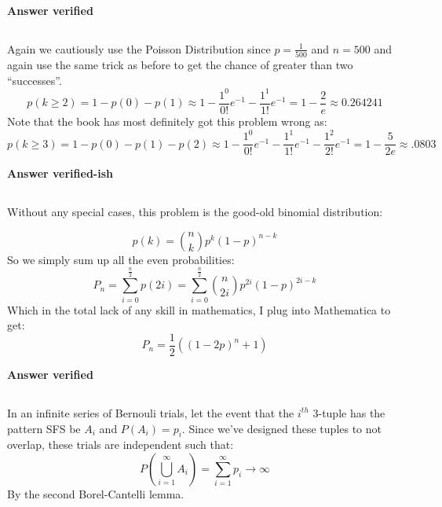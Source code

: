 \textbf{Answer verified}

\subsection{}

Again we cautiously use the Poisson Distribution since $p=\frac{1}{500}$ and $n=500$ and again use the same trick as before to get the chance of greater than two ``successes''.
\begin{equation}
	p(k \geq 2) = 1 - p(0) - p(1) \approx 1 - \frac{1^0}{0!}e^{-1} - \frac{1^1}{1!}e^{-1} = 1 - \frac{2}{e} \approx 0.264241
\end{equation}
Note that the book has most definitely got this problem wrong as:
\begin{equation}
	p(k \geq 3) = 1 - p(0) - p(1) - p(2) \approx 1 - \frac{1^0}{0!}e^{-1} - \frac{1^1}{1!}e^{-1}- \frac{1^2}{2!}e^{-1} = 1 - \frac{5}{2e} \approx .0803
\end{equation}

\textbf{Answer verified-ish}


\subsection{}

Without any special cases, this problem is the good-old binomial distribution:

\begin{equation}
	p(k) = \binom{n}{k} p^k(1-p)^{n-k}
\end{equation}
So we simply sum up all the even probabilities:
\begin{equation}
	P_n = \sum_{i=0}^{\frac{n}{2}} p(2i) = \sum_{i=0}^{\frac{n}{2}} \binom{n}{2i} p^{2i}(1-p)^{2i-k}
\end{equation}
Which in the total lack of any skill in mathematics, I plug into Mathematica to get:
\begin{equation}
	P_n = \frac{1}{2} \left((1-2 p)^n+1\right)
\end{equation}

\textbf{Answer verified}

\subsection{}
In an infinite series of Bernouli trials, let the event that the $i^{th}$ 3-tuple has the pattern SFS be $A_i$ and $P(A_i)=p_i$.  Since we've designed these tuples to not overlap, these trials are independent such that:
\begin{equation}
	P\left( \bigcup_{i=1}^{\infty} A_i \right) = \sum _{i=1}^{\infty} p_i \rightarrow \infty
\end{equation}
By the second Borel-Cantelli lemma.


